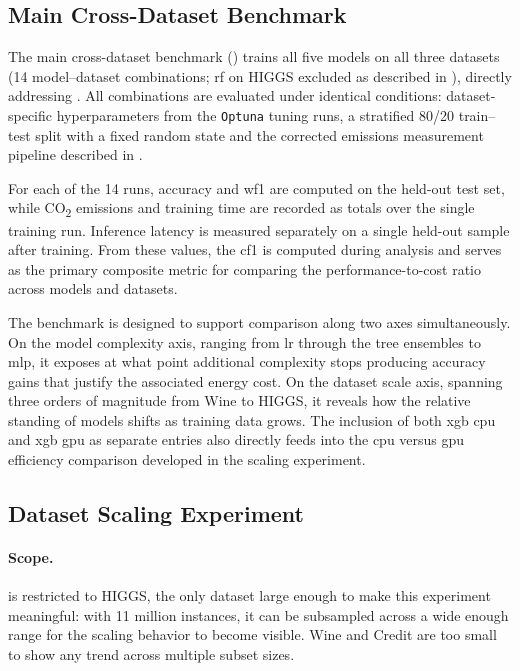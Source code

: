 \subsection{Main Cross-Dataset Benchmark}
\label{design_main_benchmark}\label{exp:1}

The main cross-dataset benchmark () trains all five models on all three datasets (14 model--dataset combinations; \gls{rf} on HIGGS excluded as described in ), directly addressing . All combinations are evaluated under identical conditions: dataset-specific hyperparameters from the \texttt{Optuna} tuning runs, a stratified 80/20 train--test split with a fixed random state and the corrected emissions measurement pipeline described in .

For each of the 14 runs, accuracy and \gls{wf1} are computed on the held-out test set, while CO\textsubscript{2} emissions and training time are recorded as totals over the single training run. Inference latency is measured separately on a single held-out sample after training. From these values, the \gls{cf1} is computed during analysis and serves as the primary composite metric for comparing the performance-to-cost ratio across models and datasets.

The benchmark is designed to support comparison along two axes simultaneously. On the model complexity axis, ranging from \gls{lr} through the tree ensembles to \gls{mlp}, it exposes at what point additional complexity stops producing accuracy gains that justify the associated energy cost. On the dataset scale axis, spanning three orders of magnitude from Wine to HIGGS, it reveals how the relative standing of models shifts as training data grows. The inclusion of both \gls{xgb} \gls{cpu} and \gls{xgb} \gls{gpu} as separate entries also directly feeds into the \gls{cpu} versus \gls{gpu} efficiency comparison developed in the scaling experiment.

\subsection{Dataset Scaling Experiment}
\label{design_scaling}\label{exp:2}

\paragraph{Scope.}
 is restricted to HIGGS, the only dataset large enough to make this experiment meaningful: with 11 million instances, it can be subsampled across a wide enough range for the scaling behavior to become visible. Wine and Credit are too small to show any trend across multiple subset sizes.

